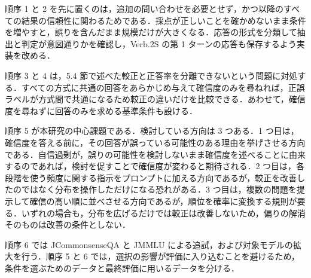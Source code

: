 順序 1 と 2 を先に置くのは，追加の問い合わせを必要とせず，かつ以降のすべての結果の信頼性に関わるためである．採点が正しいことを確かめないまま条件を増やすと，誤りを含んだまま規模だけが大きくなる．応答の形式を分類して抽出と判定が意図通りかを確認し，Verb.2S の第 1 ターンの応答も保存するよう実装を改める．

順序 3 と 4 は，5.4 節で述べた較正と正答率を分離できないという問題に対処する．すべての方式に共通の回答をあらかじめ与えて確信度のみを尋ねれば，正誤ラベルが方式間で共通になるため較正の違いだけを比較できる．あわせて，確信度を尋ねずに回答のみを求める基準条件も設ける．

順序 5 が本研究の中心課題である．検討している方向は 3 つある．1 つ目は，確信度を答える前に，その回答が誤っている可能性のある理由を挙げさせる方向である．自信過剰が，誤りの可能性を検討しないまま確信度を述べることに由来するのであれば，検討を促すことで確信度が変わると期待される．2 つ目は，各段階を使う頻度に関する指示をプロンプトに加える方向であるが，較正を改善したのではなく分布を操作しただけになる恐れがある．3 つ目は，複数の問題を提示して確信の高い順に並べさせる方向であるが，順位を確率に変換する規則が要る．いずれの場合も，分布を広げるだけでは較正は改善しないため，偏りの解消そのものは改善の条件としない．

順序 6 では JCommonsenseQA と JMMLU による追試，および対象モデルの拡大を行う．順序 5 と 6 では，選択の影響が評価に入り込むことを避けるため，条件を選ぶためのデータと最終評価に用いるデータを分ける．
